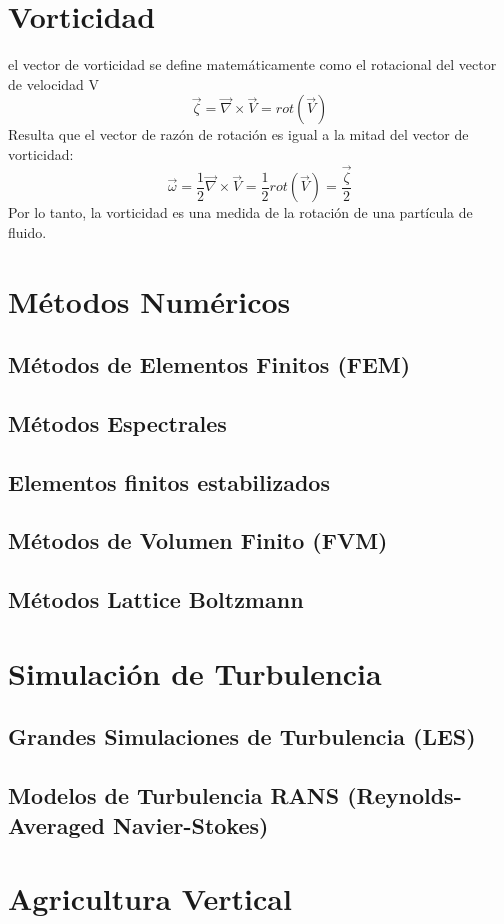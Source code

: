 \section{Vorticidad}
el vector de vorticidad se define matemáticamente como el rotacional del vector de velocidad V
\begin{equation}
    \vec{\zeta} = \vec{\nabla} \times  \vec{V} = rot(\vec{V})
\end{equation}
Resulta que el vector de razón de rotación es igual a la mitad del vector de vorticidad:
\begin{equation}
\vec{\omega} = \frac{1}{2}\vec{\nabla} \times \vec{V} = \frac{1}{2} rot(\vec{V}) = \frac{\vec{\zeta}}{2}
\end{equation}
Por lo tanto, la vorticidad es una medida de la rotación de una partícula de fluido.

\section{Métodos Numéricos}
\subsection{Métodos de Elementos Finitos (FEM)} 
\subsection{Métodos Espectrales}
\subsection{Elementos finitos estabilizados}
\subsection{Métodos de Volumen Finito (FVM)}
\subsection{Métodos Lattice Boltzmann}

\section{Simulación de Turbulencia}
\subsection{Grandes Simulaciones de Turbulencia (LES)}
\subsection{Modelos de Turbulencia RANS (Reynolds-Averaged Navier-Stokes)}




\section{Agricultura Vertical}


